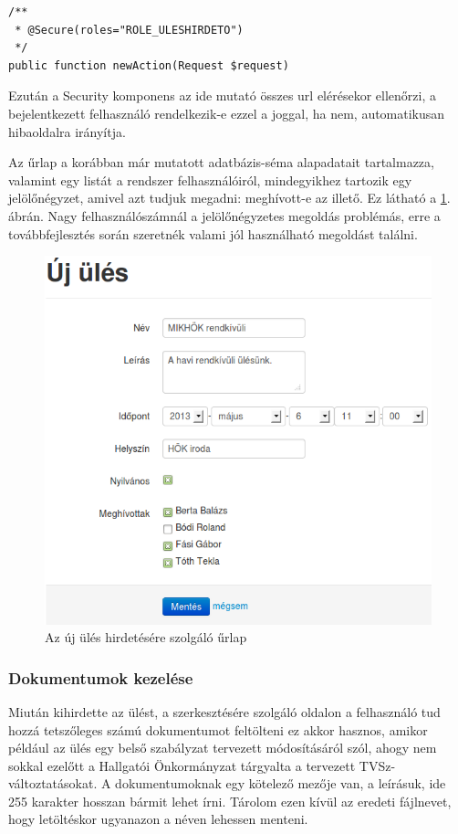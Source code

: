 \documentclass[a4paper,12pt,oneside]{report}
\begin{document}
\begin{lstlisting}
/**
 * @Secure(roles="ROLE_ULESHIRDETO")
 */
public function newAction(Request $request)
\end{lstlisting}

Ezután a Security komponens az ide mutató összes url elérésekor ellenőrzi, a bejelentkezett felhasználó rendelkezik-e ezzel a joggal, ha nem, automatikusan hibaoldalra irányítja.

Az űrlap a korábban már mutatott adatbázis-séma alapadatait tartalmazza, valamint egy listát a rendszer felhasználóiról, mindegyikhez tartozik egy jelölőnégyzet, amivel azt tudjuk megadni: meghívott-e az illető. Ez látható a \ref{fig:ules_uj}. ábrán. Nagy felhasználószámnál a jelölőnégyzetes megoldás problémás, erre a továbbfejlesztés során szeretnék valami jól használható megoldást találni.

\begin{figure}[h]
    \centering
    \includegraphics[width=.9\textwidth]{ules_uj.png}
    \caption{Az új ülés hirdetésére szolgáló űrlap}
    \label{fig:ules_uj}
\end{figure}

\subsubsection*{Dokumentumok kezelése}

Miután kihirdette az ülést, a szerkesztésére szolgáló oldalon a felhasználó tud hozzá tetszőleges számú dokumentumot feltölteni \textendash{} ez akkor hasznos, amikor például az ülés egy belső szabályzat tervezett módosításáról szól, ahogy nem sokkal ezelőtt a Hallgatói Önkormányzat tárgyalta a tervezett TVSz-változtatásokat. A dokumentumoknak egy kötelező mezője van, a leírásuk, ide 255 karakter hosszan bármit lehet írni. Tárolom ezen kívül az eredeti fájlnevet, hogy letöltéskor ugyanazon a néven lehessen menteni.
\end{document}
